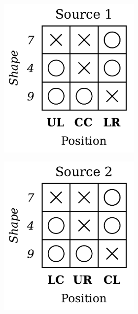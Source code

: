 \begin{dataset}
\begin{figure}[H]
\begin{subfigure}[b]{0.45\textwidth}
\begin{subfigure}[b]{0.48\textwidth}
                \includegraphics[width=\textwidth]{img/datasets/1-CGO_fact=pos_env=0.pdf}
            \end{subfigure}
            \begin{subfigure}[b]{0.48\textwidth}
                \centering
                \includegraphics[width=\textwidth]{img/datasets/1-CGO_fact=pos_env=1.pdf}

\end{subfigure}
\end{subfigure}
\end{figure}
\end{dataset}
